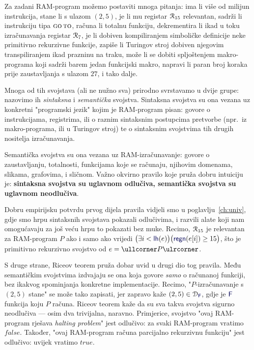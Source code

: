 Za zadani RAM-program možemo postaviti mnoga pitanja: ima li više od milijun instrukcija, stane li s ulazom $(2,5)$, je li mu registar $\mathcal R_{15}$ relevantan, sadrži li instrukciju tipa $\textsc{go\,to}$, računa li totalnu funkciju, dekrementira li ikad u toku izračunavanja registar $\mathcal R_{7}$, je li dobiven kompiliranjem simboličke definicije neke primitivno rekurzivne funkcije, zapiše li Turingov stroj dobiven njegovim transpiliranjem ikad prazninu na traku, može li se dobiti spljoštenjem makro-programa koji sadrži barem jedan funkcijski makro, napravi li paran broj koraka prije zaustavljanja s ulazom $27$, i tako dalje.

Mnoga od tih svojstava (ali ne nužno sva) prirodno svrstavamo u dvije grupe: nazovimo ih \emph{sintaksna} i \emph{semantička} svojstva. Sintaksna svojstva su ona vezana uz konkretni "programski jezik" kojim je RAM-program pisan: govore o instrukcijama, registrima, ili o raznim sintaksnim postupcima pretvorbe (npr.\ iz makro-programa, ili u Turingov stroj) te o sintaksnim svojstvima tih drugih nositelja izračunavanja.

Semantička svojstva su ona vezana uz RAM-izračunavanje: govore o zaustavljanju, totalnosti, funkcijama koje se računaju, njihovim domenama, slikama, grafovima, i sličnom. Važno okvirno pravilo koje pruža dobru intuiciju je: \textbf{sintaksna svojstva su uglavnom odlučiva, semantička svojstva su uglavnom neodlučiva}.

Dobru empirijsku potvrdu prvog dijela pravila vidjeli smo u poglavlju~\ref{ch:univ}, gdje smo hrpu sintaksnih svojstava pokazali odlučivima, i razvili alate koji nam omogućavaju za još veću hrpu to pokazati bez muke. Recimo, $\mathcal R_{15}$ je relevantan za RAM-program $P$ ako i samo ako vrijedi
$\bigl(\exists i<\f{lh}(e)\bigr)\bigl(\f{regn}(e[i])\ge15\bigr)$, što je primitivno rekurzivno svojstvo od $e=\kprog P$.

S druge strane, Riceov teorem pruža dobar uvid u drugi dio tog pravila. Među semantičkim svojstvima izdvajaju se ona koja govore \emph{samo} o računanoj funkciji, bez ikakvog spominjanja konkretne implementacije. Recimo, "$P$-izračunavanje s $(2,5)$ stane" se može tako zapisati, jer zapravo kaže $(2,5)\in\dom{\f F}$, gdje je $\f F$ funkcija koju $P$ računa. Riceov teorem kaže da su sva takva svojstva sigurno neodlučiva --- osim dva trivijalna, naravno. Primjerice, svojstvo "ovaj RAM-program rješava \emph{halting problem}" jest odlučivo: za svaki RAM-program vratimo $\mathit{false}$. Također, "ovaj RAM-program računa parcijalno rekurzivnu funkciju" jest odlučivo: uvijek vratimo $\mathit{true}$.

